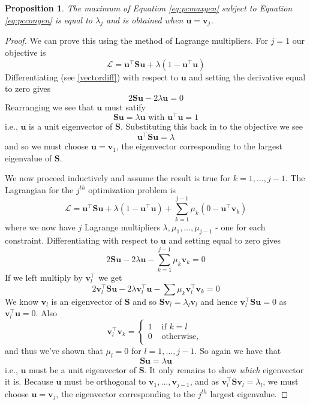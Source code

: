 \documentclass[
]{book}
\newtheorem{proposition}{Proposition}[chapter]
\theoremstyle{definition}
\theoremstyle{definition}
\theoremstyle{definition}
\theoremstyle{definition}
\theoremstyle{remark}
\begin{document}
\begin{proposition}
\protect\hypertarget{prp:pca1}{}\label{prp:pca1}The maximum of Equation \eqref{eq:pcmaxgen}
subject to Equation \eqref{eq:pccongen} is equal to \(\lambda_j\) and is obtained when \(\mathbf u=\mathbf v_j\).
\end{proposition}

\begin{proof}
We can prove this using the method of Lagrange multipliers. For \(j=1\) our objective is
\[\mathcal{L} = \mathbf u^\top  \mathbf S\mathbf u+\lambda(1-\mathbf u^\top \mathbf u)\]
Differentiating (see \ref{vectordiff}) with respect to \(\mathbf u\) and setting the derivative equal to zero gives
\[2\mathbf S\mathbf u-2\lambda \mathbf u=0\]
Rearranging we see that \(\mathbf u\) must satify
\[\mathbf S\mathbf u=\lambda \mathbf u\mbox{ with } \mathbf u^\top \mathbf u=1\]
i.e., \(\mathbf u\) is a unit eigenvector of \(\mathbf S\). Substituting this back in to the objective we see
\[\mathbf u^\top \mathbf S\mathbf u= \lambda\]
and so we must choose \(\mathbf u=\mathbf v_1\), the eigenvector corresponding to the largest eigenvalue of \(\mathbf S\).

We now proceed inductively and assume the result is true for \(k=1, \ldots, j-1\). The Lagrangian for the \(j^{th}\) optimization problem is
\[\mathcal{L} = \mathbf u^\top  \mathbf S\mathbf u+\lambda(1-\mathbf u^\top \mathbf u) +\sum_{k=1}^{j-1}\mu_k (0-\mathbf u^\top \mathbf v_k)\]
where we now have \(j\) Lagrange multipliers \(\lambda, \mu_1, \ldots, \mu_{j-1}\) - one for each constraint.
Differentiating with respect to \(\mathbf u\) and setting equal to zero gives
\[2\mathbf S\mathbf u- 2\lambda \mathbf u- \sum_{k=1}^{j-1} \mu_k\mathbf v_k=0 \]
If we left multiply by \(\mathbf v_l^\top\) we get
\[2\mathbf v_l^\top \mathbf S\mathbf u- 2\lambda \mathbf v_l^\top \mathbf u- \sum \mu_k \mathbf v_l^\top \mathbf v_k =0\]
We know \(\mathbf v_l\) is an eigenvector of \(\mathbf S\) and so \(\mathbf S\mathbf v_l=\lambda_l \mathbf v_l\) and hence \(\mathbf v_l^\top \mathbf S\mathbf u=0\) as \(\mathbf v_l^\top \mathbf u=0\). Also \[\mathbf v_l^\top\mathbf v_k=\begin{cases}1 &\mbox{ if } k=l\\
0 &\mbox{ otherwise, }\end{cases}\] and thus we've shown that \(\mu_l=0\) for \(l=1, \ldots, j-1\). So again we have that \[\mathbf S\mathbf u= \lambda \mathbf u\]
i.e., \(\mathbf u\) must be a unit eigenvector of \(\mathbf S\). It only remains to show \emph{which} eigenvector it is. Because \(\mathbf u\) must be orthogonal to \(\mathbf v_1, \ldots, \mathbf v_{j-1}\),
and as \(\mathbf v_l^\top \mathbf S\mathbf v_l = \lambda_l\), we must choose \(\mathbf u=\mathbf v_j\), the eigenvector corresponding to the \(j^{th}\) largest eigenvalue.
\end{proof}
\end{document}
